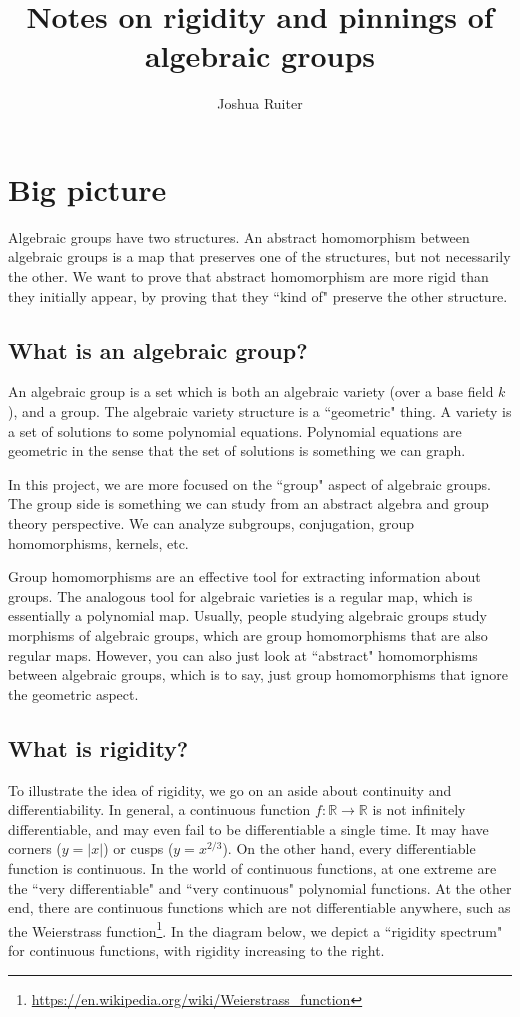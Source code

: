 \documentclass[12pt]{article}
\title{Notes on rigidity and pinnings of algebraic groups}
\author{Joshua Ruiter}
\theoremstyle{definition}
\numberwithin{theorem}{subsection}
\newcommand{\R}{\mathbb{R}}
\begin{document}
\maketitle
\tableofcontents

\newpage
\section{Big picture}

Algebraic groups have two structures. An abstract homomorphism between algebraic groups is a map that preserves one of the structures, but not necessarily the other. We want to prove that abstract homomorphism are more rigid than they initially appear, by proving that they ``kind of" preserve the other structure.

\subsection{What is an algebraic group?}

An algebraic group is a set which is both an algebraic variety (over a base field $k$), and a group. The algebraic variety structure is a ``geometric" thing. A variety is a set of solutions to some polynomial equations. Polynomial equations are geometric in the sense that the set of solutions is something we can graph. 

In this project, we are more focused on the ``group" aspect of algebraic groups. The group side is something we can study from an abstract algebra and group theory perspective. We can analyze subgroups, conjugation, group homomorphisms, kernels, etc. 

Group homomorphisms are an effective tool for extracting information about groups. The analogous tool for algebraic varieties is a regular map, which is essentially a polynomial map. Usually, people studying algebraic groups study morphisms of algebraic groups, which are group homomorphisms that are also regular maps. However, you can also just look at ``abstract" homomorphisms between algebraic groups, which is to say, just group homomorphisms that ignore the geometric aspect.

\subsection{What is rigidity?}

To illustrate the idea of rigidity, we go on an aside about continuity and differentiability. In general, a continuous function $f:\R \to \R$ is not infinitely differentiable, and may even fail to be differentiable a single time. It may have corners ($y=|x|$) or cusps ($y=x^{2/3}$). On the other hand, every differentiable function is continuous. In the world of continuous functions, at one extreme are the ``very differentiable" and ``very continuous" polynomial functions. At the other end, there are continuous functions which are not differentiable anywhere, such as the Weierstrass function\footnote{\url{https://en.wikipedia.org/wiki/Weierstrass_function}}. In the diagram below, we depict a ``rigidity spectrum" for continuous functions, with rigidity increasing to the right.
\end{document}
